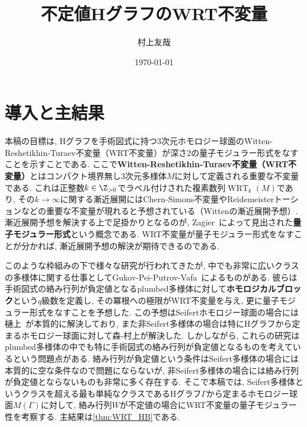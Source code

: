 \documentclass[11pt,b5paper,oneside,lualatex]{ltjsarticle} %
\DeclareMathOperator{\WRT}{WRT}
\numberwithin{equation}{section} %
\begin{document}

\title{不定値HグラフのWRT不変量}
\author{村上友哉}
\date{\today}

\maketitle

\tableofcontents


\section{導入と主結果} \label{sec:intro}


本稿の目標は, Hグラフを手術図式に持つ$ 3 $次元ホモロジー球面のWitten-Reshetikhin-Turaev不変量（WRT不変量）が深さ$ 2 $の量子モジュラー形式をなすことを示すことである. 
ここで\textbf{Witten-Reshetikhin-Turaev不変量（WRT不変量）}とはコンパクト境界無し$ 3 $次元多様体$ M $に対して定義される重要な不変量である. 
これは正整数$ k \in \Z_{>0} $でラベル付けされた複素数列$ \WRT_k(M) $であり, その$ k \to \infty $に関する漸近展開にはChern-Simons不変量やReidemeisterトーションなどの重要な不変量が現れると予想されている（Wittenの漸近展開予想）. 
漸近展開予想を解決する上で足掛かりとなるのが, Zagier~\cite{Zagier_quantum}によって見出された\textbf{量子モジュラー形式}という概念である. 
WRT不変量が量子モジュラー形式をなすことが分かれば, 漸近展開予想の解決が期待できるのである. 

このような枠組みの下で様々な研究が行われてきたが, 中でも非常に広いクラスの多様体に関する仕事としてGukov-Pei-Putrov-Vafa~\cite{GPPV}によるものがある. 彼らは手術図式の絡み行列が負定値となるplumbed多様体に対して\textbf{ホモロジカルブロック}という$ q $級数を定義し, その冪根への極限がWRT不変量を与え, 更に量子モジュラー形式をなすことを予想した. 
この予想はSeifertホモロジー球面の場合には樋上~\cite{Hikami_Seifert}が本質的に解決しており, また非Seifert多様体の場合は特にHグラフから定まるホモロジー球面に対して森-村上\cite{MM}が解決した. 
しかしながら, これらの研究はplumbed多様体の中でも特に手術図式の絡み行列が負定値となるものを考えているという問題点がある. 
絡み行列が負定値という条件はSeifert多様体の場合には本質的に空な条件なので問題にならないが, 非Seifert多様体の場合には絡み行列が負定値とならないものも非常に多く存在する. 
そこで本稿では, Seifert多様体というクラスを超える最も単純なクラスであるHグラフ$ \Gamma $から定まるホモロジー球面$ M(\Gamma) $に対して, 絡み行列$ W $が不定値の場合にWRT不変量の量子モジュラー性を考察する. 
主結果は\cref{thm:WRT_HB}である. 
\end{document}
